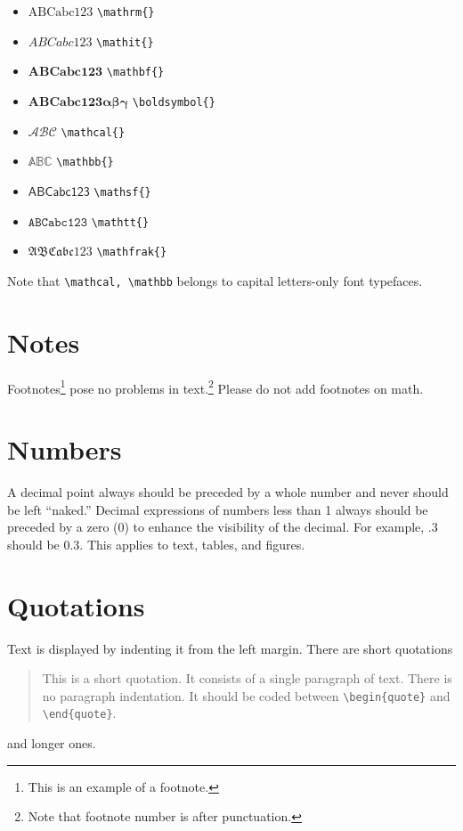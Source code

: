 \documentclass[qe,nameyear,draft]{econsocart}
\theoremstyle{plain}
\theoremstyle{remark}
\begin{document}
\begin{itemize}
\item $\mathrm{ABCabc123}$ \texttt{{\textbackslash}mathrm\{\}}
\item $\mathit{ABCabc123}$ \texttt{{\textbackslash}mathit\{\}}
\item $\mathbf{ABCabc123}$ \texttt{{\textbackslash}mathbf\{\}}
\item $\boldsymbol{ABCabc123\alpha\beta\gamma}$ \texttt{{\textbackslash}boldsymbol\{\}}
\item $\mathcal{ABC}$ \texttt{{\textbackslash}mathcal\{\}}
\item $\mathbb{ABC}$ \texttt{{\textbackslash}mathbb\{\}}
\item $\mathsf{ABCabc123}$ \texttt{{\textbackslash}mathsf\{\}}
\item $\mathtt{ABCabc123}$ \texttt{{\textbackslash}mathtt\{\}}
\item $\mathfrak{ABCabc123}$ \texttt{{\textbackslash}mathfrak\{\}}
\end{itemize}

Note that \texttt{{\textbackslash}mathcal, {\textbackslash}mathbb} belongs to capital letters-only font typefaces.

\section{Notes}

Footnotes\footnote{This is an example of a footnote.} pose no problems in text.\footnote{Note that footnote number is after punctuation.} Please do not add footnotes on math.

\section{Numbers}

A decimal point always should be preceded by a whole number and never should be left ``naked.'' Decimal expressions of numbers less than 1 always should be preceded by a zero (0) to enhance the visibility of the decimal. For example, .3 should be 0.3. This applies to text, tables, and figures.

\section{Quotations}

Text is displayed by indenting it from the left margin. There are short quotations


\begin{quote}
This is a short quotation.  It consists of a
single paragraph of text.  There is no paragraph
indentation. It should be coded between \verb|\begin{quote}| and \verb|\end{quote}|.
\end{quote}
and longer ones.
\end{document}
